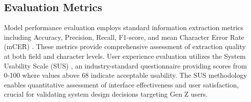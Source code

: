 \subsection{Evaluation Metrics}
Model performance evaluation employs standard information extraction metrics including Accuracy, Precision, Recall, F1-score, and mean Character Error Rate (mCER) \cite{neudecker2021survey}. These metrics provide comprehensive assessment of extraction quality at both field and character levels. User experience evaluation utilizes the System Usability Scale (SUS) \cite{brooke1996sus}, an industry-standard questionnaire providing scores from 0-100 where values above 68 indicate acceptable usability. The SUS methodology enables quantitative assessment of interface effectiveness and user satisfaction, crucial for validating system design decisions targeting Gen Z users.